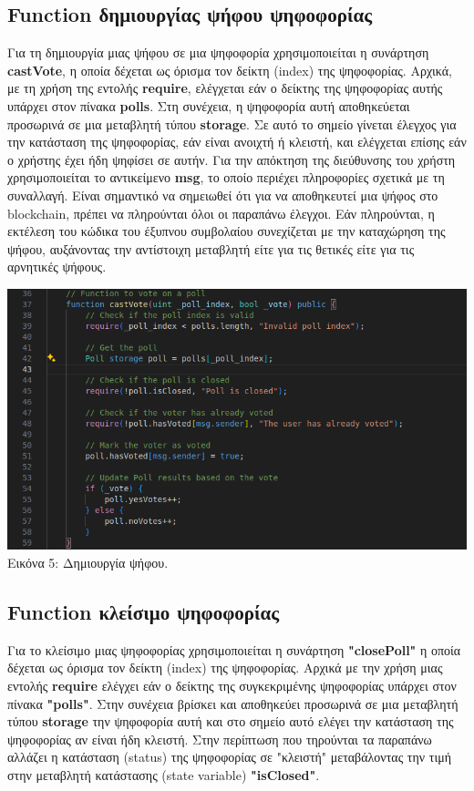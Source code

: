 \documentclass[12pt]{article}
\begin{document}
    \subsection{Function δημιουργίας ψήφου ψηφοφορίας}
        Για τη δημιουργία μιας ψήφου σε μια ψηφοφορία χρησιμοποιείται η συνάρτηση \textbf{castVote}, η οποία δέχεται ως όρισμα τον δείκτη (index) της ψηφοφορίας. Αρχικά, με τη χρήση της εντολής \textbf{require}, ελέγχεται εάν ο δείκτης της ψηφοφορίας αυτής υπάρχει στον πίνακα \textbf{polls}. Στη συνέχεια, η ψηφοφορία αυτή αποθηκεύεται προσωρινά σε μια μεταβλητή τύπου \textbf{storage}. Σε αυτό το σημείο γίνεται έλεγχος για την κατάσταση της ψηφοφορίας, εάν είναι ανοιχτή ή κλειστή, και ελέγχεται επίσης εάν ο χρήστης έχει ήδη ψηφίσει σε αυτήν. Για την απόκτηση της διεύθυνσης του χρήστη χρησιμοποιείται το αντικείμενο \textbf{msg}, το οποίο περιέχει πληροφορίες σχετικά με τη συναλλαγή. Είναι σημαντικό να σημειωθεί ότι για να αποθηκευτεί μια ψήφος στο blockchain, πρέπει να πληρούνται όλοι οι παραπάνω έλεγχοι. Εάν πληρούνται, η εκτέλεση του κώδικα του έξυπνου συμβολαίου συνεχίζεται με την καταχώρηση της ψήφου, αυξάνοντας την αντίστοιχη μεταβλητή είτε για τις θετικές είτε για τις αρνητικές ψήφους.

        
    \begin{center}
        \includegraphics[width=\linewidth, keepaspectratio]{images/code_cast_vote.png}
        Εικόνα 5: Δημιουργία ψήφου.
    \end{center}
    
    \subsection{Function κλείσιμο ψηφοφορίας}
        Για το κλείσιμο μιας ψηφοφορίας χρησιμοποιείται η συνάρτηση \textbf{"closePoll"} η οποία δέχεται ως όρισμα τον δείκτη (index) της ψηφοφορίας. Αρχικά με την χρήση μιας εντολής \textbf{require} ελέγχει εάν ο δείκτης της συγκεκριμένης ψηφοφορίας υπάρχει στον πίνακα \textbf{"polls"}. Στην συνέχεια βρίσκει και αποθηκεύει προσωρινά σε μια μεταβλητή τύπου \textbf{storage} την ψηφοφορία αυτή και στο σημείο αυτό ελέγει την κατάσταση της ψηφοφορίας αν είναι ήδη κλειστή. Στην περίπτωση που τηρούνται τα παραπάνω αλλάζει η κατάσταση (status) της ψηφοφορίας σε "κλειστή" μεταβάλοντας την τιμή στην μεταβλητή κατάστασης (state variable) \textbf{"isClosed"}.
    
\end{document}
